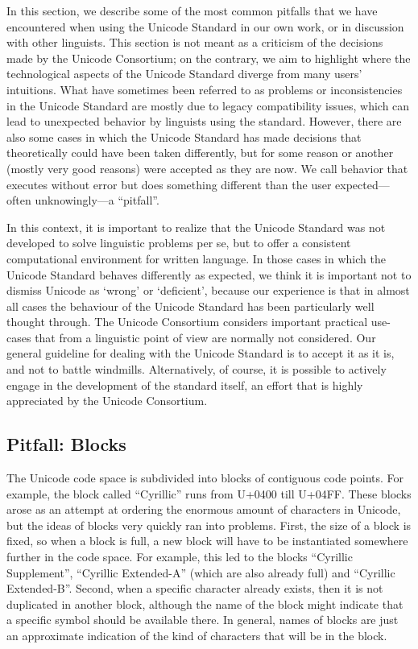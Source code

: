 {{{{{{{{{{{{{{{{In this section, we describe some of the most common pitfalls that we have encountered when using the Unicode Standard in our own work, or in discussion with other linguists. This section is not meant as a criticism of the decisions made by the Unicode Consortium; on the contrary, we aim to highlight where the technological aspects of the Unicode Standard diverge from many users' intuitions. What have sometimes been referred to as problems or inconsistencies in the Unicode Standard are mostly due to legacy compatibility issues, which can lead to unexpected behavior by linguists using the standard. However, there are also some cases in which the Unicode Standard has made decisions that theoretically could have been taken differently, but for some reason or another (mostly very good reasons) were accepted as they are now. We call behavior that executes without error but does something different than the user expected---often unknowingly---a ``pitfall''.

In this context, it is important to realize that the Unicode Standard was not developed to solve linguistic problems per se, but to offer a consistent computational environment for written language. In those cases in which the Unicode Standard behaves differently as expected, we think it is important not to dismiss Unicode as `wrong' or `deficient', because our experience is that in almost all cases the behaviour of the Unicode Standard has been particularly well thought through. The Unicode Consortium considers important practical use-cases that from a linguistic point of view are normally not considered. Our general guideline for dealing with the Unicode Standard is to accept it as it is, and not to battle windmills. Alternatively, of course, it is possible to actively engage in the development of the standard itself, an effort that is highly appreciated by the Unicode Consortium.

\subsection{Pitfall: Blocks}\label{pitfall-blocks}

The Unicode code space is subdivided into blocks of contiguous code points. For example, the block called ``Cyrillic'' runs from U+0400 till U+04FF. These blocks arose as an attempt at ordering the enormous amount of characters in Unicode, but the ideas of blocks very quickly ran into problems. First, the size of a block is fixed, so when a block is full, a new block will have to be instantiated somewhere further in the code space. For example, this led to the blocks ``Cyrillic Supplement'', ``Cyrillic Extended-A'' (which are also already full) and ``Cyrillic Extended-B''. Second, when a specific character already exists, then it is not duplicated in another block, although the name of the block might indicate that a specific symbol should be available there. In general, names of blocks are just an approximate indication of the kind of characters that will be in the block.

}}}}}}}}}}}}}}}}
